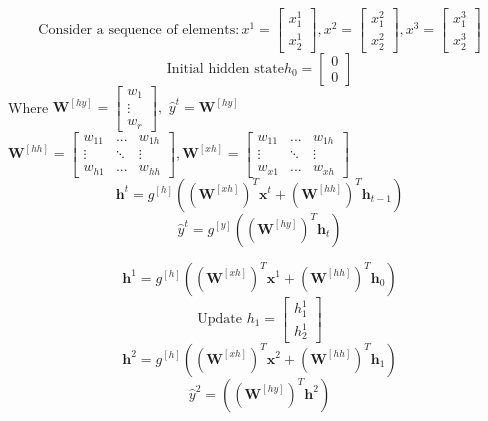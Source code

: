 \documentclass{article}
\begin{document}
\[\text{Consider a sequence of elements}: x^1 = \begin{bmatrix}
    x_1^1 \\ x_2^1
    \end{bmatrix}, x^2 = \begin{bmatrix} x_1^2 \\ x_2^2\end{bmatrix}, x^3 = \begin{bmatrix}x_1^3\\ x_2^3\end{bmatrix}\]
    \[\text{Initial hidden state} h_0 = \begin{bmatrix}0\\0\end{bmatrix}\]
Where $\textbf{W}^{[hy]} = \begin{bmatrix}w_1\\ \vdots \\ w_r \end{bmatrix},$
$\hat{y}^t = \textbf{W}^{[hy]}$\\
$\textbf{W}^{[hh]} = \begin{bmatrix}w_{11} & ... & w_{1h}\\ \vdots & \ddots & \vdots \\ w_{h1} & ... & w_{hh} \end{bmatrix}, 
\textbf{W}^{[xh]} = \begin{bmatrix}w_{11} & ... & w_{1h}\\ \vdots & \ddots & \vdots \\ w_{x1} & ... & w_{xh} \end{bmatrix}$
\[\textbf{h}^t = g^{[h]}\left((\textbf{W}^{[xh]})^T\textbf{x}^t + (\textbf{W}^{[hh]})^T \textbf{h}_{t-1}\right)\]
\[\hat{y}^t = g^{[y]}\left((\textbf{W}^{[hy]})^T\textbf{h}_t\right)\]

\[\textbf{h}^1 = g^{[h]}\left((\textbf{W}^{[xh]})^T\textbf{x}^1 + (\textbf{W}^{[hh]})^T \textbf{h}_0\right)\]
\[\text{Update }h_1 = \begin{bmatrix}
    h_1^1 \\ h_2^1
\end{bmatrix}\]
\[\textbf{h}^2 = g^{[h]}\left((\textbf{W}^{[xh]})^T\textbf{x}^2 + (\textbf{W}^{[hh]})^T \textbf{h}_1\right)\]
\[\hat{y}^2 = \left((\textbf{W}^{[hy]})^T\textbf{h}^2\right)\]
\end{document}
